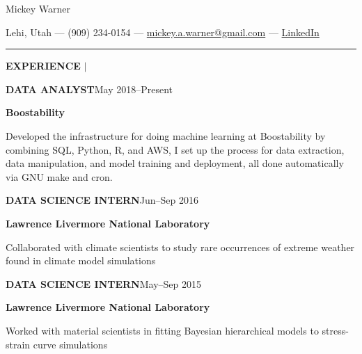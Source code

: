 \documentclass[12pt]{article}
\newcommand{\entrypar}[5]{
    \textbf{\MakeUppercase{#1}}\hfill #3--#4

    \textbf{#2}

    #5
    }
\begin{document}

\begin{center}
\begin{Huge}
Mickey Warner
\end{Huge}
\smallskip
\smallskip

Lehi, Utah --- (909) 234-0154 --- \href{mailto:mickey.a.warner@gmail.com}{mickey.a.warner@gmail.com} --- \href{https://www.linkedin.com/in/mickey-warner/}{LinkedIn}
\end{center}

\hrule

\bigskip

\begin{minipage}[t]{0.19\textwidth}
    \begin{flushright}
        \textbf{EXPERIENCE} $\vert$ \ \
    \end{flushright}
\end{minipage}%
%
\begin{minipage}[t]{0.81\textwidth}
    \begin{flushleft}
        \entrypar{Data analyst}{Boostability}{May 2018}{Present}{
Developed the infrastructure for doing machine learning at Boostability by combining SQL, Python, R, and AWS, I set up the process for data extraction, data manipulation, and model training and deployment, all done automatically via GNU make and cron.


%
%
        }

        \bigskip

        \entrypar{Data science intern}{Lawrence Livermore National Laboratory}{Jun}{Sep 2016}{Collaborated with climate scientists to study rare occurrences of extreme weather found in climate model simulations}
        \bigskip

        \entrypar{Data science intern}{Lawrence Livermore National Laboratory}{May}{Sep 2015}{Worked with material scientists in fitting Bayesian hierarchical models to stress-strain curve simulations}
    \end{flushleft}
\end{minipage}
\end{document}
